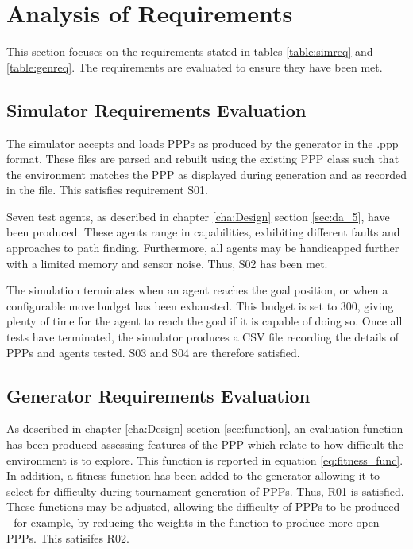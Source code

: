\documentclass[authoryearcitations]{UoYCSproject}
\begin{document}
\section{Analysis of Requirements}
\label{sec:req_eval}
This section focuses on the requirements stated in tables \ref{table:simreq} and \ref{table:genreq}. The requirements are evaluated to ensure they have been met.

\subsection{Simulator Requirements Evaluation}
\label{sec:sim_req_eval}
The simulator accepts and loads PPPs as produced by the generator in the .ppp format. These files are parsed and rebuilt using the existing PPP class such that the environment matches the PPP as displayed during generation and as recorded in the file. This satisfies requirement S01. 

Seven test agents, as described in chapter \ref{cha:Design} section \ref{sec:da_5}, have been produced. These agents range in capabilities, exhibiting different faults and approaches to path finding. Furthermore, all agents may be handicapped further with a limited memory and sensor noise. Thus, S02 has been met.

The simulation terminates when an agent reaches the goal position, or when a configurable move budget has been exhausted. This budget is set to 300, giving plenty of time for the agent to reach the goal if it is capable of doing so. Once all tests have terminated, the simulator produces a CSV file recording the details of PPPs and agents tested. S03 and S04 are therefore satisfied.

\subsection{Generator Requirements Evaluation}
\label{sec:gen_req_eval}
As described in chapter \ref{cha:Design} section \ref{sec:function}, an evaluation function has been produced assessing features of the PPP which relate to how difficult the environment is to explore. This function is reported in equation \ref{eq:fitness_func}. In addition, a fitness function has been added to the generator allowing it to select for difficulty during tournament generation of PPPs. Thus, R01 is satisfied. These functions may be adjusted, allowing the difficulty of PPPs to be produced - for example, by reducing the weights in the function to produce more open PPPs. This satisifes R02.
\end{document}

